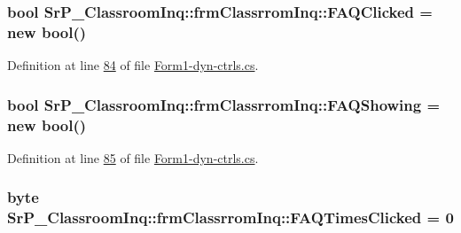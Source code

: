 \hypertarget{class_sr_p___classroom_inq_1_1frm_classrrom_inq_a2b3fd84c890215dd61c54946b49906d2}{
\subsubsection[{\-F\-A\-Q\-Clicked}]{\setlength{\rightskip}{0pt plus 5cm}bool {\bf \-Sr\-P\-\_\-\-Classroom\-Inq\-::frm\-Classrrom\-Inq\-::\-F\-A\-Q\-Clicked} = new bool()}}
\label{class_sr_p___classroom_inq_1_1frm_classrrom_inq_a2b3fd84c890215dd61c54946b49906d2}


\-Definition at line \hyperlink{_form1-dyn-ctrls_8cs_source_l00084}{84} of file \hyperlink{_form1-dyn-ctrls_8cs_source}{\-Form1-\/dyn-\/ctrls.\-cs}.

\hypertarget{class_sr_p___classroom_inq_1_1frm_classrrom_inq_a37a892198dda5bfa752c66df2debb199}{
\subsubsection[{\-F\-A\-Q\-Showing}]{\setlength{\rightskip}{0pt plus 5cm}bool {\bf \-Sr\-P\-\_\-\-Classroom\-Inq\-::frm\-Classrrom\-Inq\-::\-F\-A\-Q\-Showing} = new bool()}}
\label{class_sr_p___classroom_inq_1_1frm_classrrom_inq_a37a892198dda5bfa752c66df2debb199}


\-Definition at line \hyperlink{_form1-dyn-ctrls_8cs_source_l00085}{85} of file \hyperlink{_form1-dyn-ctrls_8cs_source}{\-Form1-\/dyn-\/ctrls.\-cs}.

\hypertarget{class_sr_p___classroom_inq_1_1frm_classrrom_inq_a81d1b27ebc720a6da339e1816eab4dfa}{
\subsubsection[{\-F\-A\-Q\-Times\-Clicked}]{\setlength{\rightskip}{0pt plus 5cm}byte {\bf \-Sr\-P\-\_\-\-Classroom\-Inq\-::frm\-Classrrom\-Inq\-::\-F\-A\-Q\-Times\-Clicked} = 0}}
\label{class_sr_p___classroom_inq_1_1frm_classrrom_inq_a81d1b27ebc720a6da339e1816eab4dfa}


